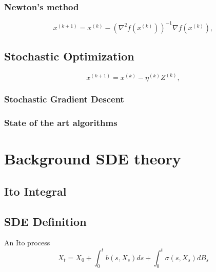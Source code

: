 \documentclass[12pt]{article}
\theoremstyle{definition}
\numberwithin{equation}{section}
\begin{document}
\subsubsection{Newton's method}
\begin{equation}
  x^{(k+1)} = x^{(k)} - (\nabla^2 f(x^{(k)}))^{-1}\nabla f(x^{(k)}),
\end{equation}
\subsection{Stochastic Optimization}
\label{sec:StochasticOptimization}
\begin{equation}
  x^{(k+1)} = x^{(k)} - \eta^{(k)} Z^{(k)},
\end{equation}
\subsubsection{Stochastic Gradient Descent}

\subsubsection{State of the art algorithms}
\label{sec:StateOfTheArtAlgorithms}

\section{Background SDE theory}
\label{sec:BackgroundSDETheory}
\subsection{Ito Integral}
\label{subsec:ItoIntegral}
\subsection{SDE Definition}
\label{subsec:SDEDefinition}

An Ito process 
\begin{equation}
  X_t = X_0 + \int_0^tb(s, X_s)ds + \int_0^t \sigma(s, X_s)dB_s
\end{equation}
\end{document}
